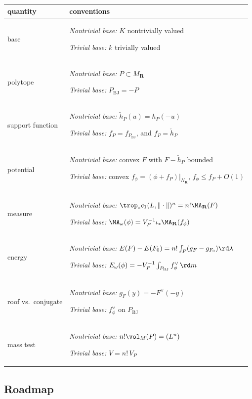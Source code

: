 \begin{center}
\begin{tabular}{p{}p{}}
\toprule
quantity & conventions\\
\midrule
base  & \emph{Nontrivial base:} $K$ nontrivially valued\par\smallskip \emph{Trivial base:} $k$ trivially valued\\

polytope  & \emph{Nontrivial base:} $P\subset M_{\mathbf R}$\par\smallskip \emph{Trivial base:} $P_{\mathrm{BJ}}=-P$\\

support function  & \emph{Nontrivial base:} $\check h_P(u)=h_P(-u)$\par\smallskip \emph{Trivial base:} $f_P=f_{P_{\mathrm{BJ}}}$,
 and $f_P=\check h_P$\\

potential  & \emph{Nontrivial base:} convex $F$ with $F-\check h_P$ bounded\par\smallskip \emph{Trivial base:} convex $f_\phi=(\phi+f_P)|_{N_{\mathbf R}}$, $f_\phi\le f_P+O(1)$\\

measure  & \emph{Nontrivial base:} $\trop_*c_1(L,\|\cdot\|)^n=n!\MA_{\mathbf R}(F)$\par\smallskip \emph{Trivial base:} $\MA_\omega(\phi)=V_P^{-1}\iota_*\MA_{\mathbf R}(f_\phi)$\\

energy  & \emph{Nontrivial base:} $E(F)-E(F_0)=n!\int_P(g_F-g_{F_0})\rd\lambda$\par\smallskip \emph{Trivial base:} $E_\omega(\phi)=-V_P^{-1}\int_{P_{\mathrm{BJ}}}f_\phi^\vee\,\rd m$\\

roof vs.\ conjugate  & \emph{Nontrivial base:} $g_F(y)=-F^\vee(-y)$\par\smallskip \emph{Trivial base:} $f^\vee_\phi$ on
 $P_{\mathrm{BJ}}$\\

mass test  & \emph{Nontrivial base:} $n!\vol_M(P)=(L^n)$\par\smallskip \emph{Trivial base:} $V=n!\,V_P$\\
\bottomrule
\end{tabular}
\end{center}

\subsection{Roadmap}
\label{sec:ch49-roadmap}

